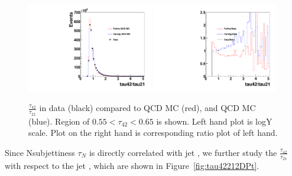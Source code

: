 \begin{figure}[htb]
\begin{center}
\includegraphics[width=0.49\textwidth,angle=0]{EXO-14-009/figs/SFExtra/SFSameJetRatioPlot55L.pdf}
\includegraphics[width=0.49\textwidth,angle=0]{EXO-14-009/figs/SFExtra/SFRatioRatioPlot55L.pdf}
\end{center}
\caption{
$\frac{\tau_{42}}{\tau_{21}}$ in data (black) compared to \PYTHIA QCD MC (red), and 
\HERWIG QCD MC (blue). Region of $0.55 < \tau_{42} < 0.65$ is shown. 
Left hand plot is logY scale. Plot on the right hand is corresponding 
ratio plot of left hand.  
}
\label{fig:tau4221samejetL}
\end{figure}

\clearpage
\newpage



Since Nsubjettiness $\tau_{N}$ is directly correlated with jet \pt, we further study
the $\frac{\tau_{42}}{\tau_{21}}$ with respect to the jet \pt, which are shown in 
Figure~\ref{fig:tau42212DPt}. 

